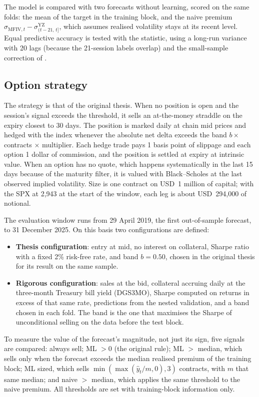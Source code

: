 \documentclass[11pt,a4paper]{article}
\begin{document}
The model is compared with two forecasts without learning, scored on the same folds: the mean of the target in the training block, and the naive premium $\sigma_{\text{MFIV},t}-\sigma^{\text{YZ}}_{(t-21,\,t]}$, which assumes realised volatility stays at its recent level. Equal predictive accuracy is tested with the \citet{dieboldmariano1995} statistic, using a \citet{neweywest1987} long-run variance with 20 lags (because the 21-session labels overlap) and the small-sample correction of \citet{hln1997}.

\subsection{Option strategy}\label{sec:strategy}

The strategy is that of the original thesis. When no position is open and the session's signal exceeds the threshold, it sells an at-the-money straddle on the expiry closest to 30 days. The position is marked daily at chain mid prices and hedged with the index whenever the absolute net delta exceeds the band $b\times$ contracts $\times$ multiplier. Each hedge trade pays 1 basis point of slippage and each option 1 dollar of commission, and the position is settled at expiry at intrinsic value. When an option has no quote, which happens systematically in the last 15 days because of the maturity filter, it is valued with Black--Scholes \citep{blackscholes1973,merton1973} at the last observed implied volatility. Size is one contract on USD~1 million of capital; with the SPX at 2,943 at the start of the window, each leg is about USD~294,000 of notional.

The evaluation window runs from 29 April 2019, the first out-of-sample forecast, to 31 December 2025. On this basis two configurations are defined:
\begin{itemize}
  \item \textbf{Thesis configuration}: entry at mid, no interest on collateral, Sharpe ratio with a fixed 2\% risk-free rate, and band $b=0.50$, chosen in the original thesis for its result on the same sample.
  \item \textbf{Rigorous configuration}: sales at the bid, collateral accruing daily at the three-month Treasury bill yield (DGS3MO), Sharpe computed on returns in excess of that same rate, predictions from the nested validation, and a band chosen in each fold. The band is the one that maximises the Sharpe of unconditional selling on the data before the test block.
\end{itemize}
To measure the value of the forecast's magnitude, not just its sign, five signals are compared: always sell; ML $>0$ (the original rule); ML $>$ median, which sells only when the forecast exceeds the median realised premium of the training block; ML sized, which sells $\min(\max(\hat y_t/m,0),3)$ contracts, with $m$ that same median; and naive $>$ median, which applies the same threshold to the naive premium. All thresholds are set with training-block information only.
\end{document}
